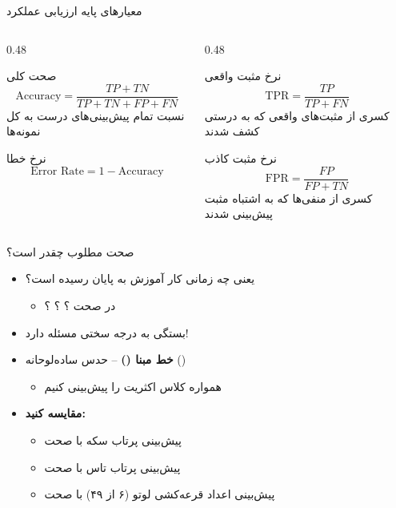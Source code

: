 \begin{frame}{معیارهای پایه ارزیابی عملکرد}{}
  \begin{columns}[T]
    \begin{column}{0.48\textwidth}
      \begin{block}{صحت کلی \ }
        \[
          \text{Accuracy} = \frac{TP + TN}{TP + TN + FP + FN}
        \]
        نسبت تمام پیش‌بینی‌های درست به کل نمونه‌ها
      \end{block}
      \begin{block}{نرخ خطا \ }
        \[
          \text{Error Rate} = 1 - \text{Accuracy}
        \]
      \end{block}
    \end{column}
    \begin{column}{0.48\textwidth}
      \begin{block}{نرخ مثبت واقعی \ }
        \[
          \text{TPR} = \frac{TP}{TP + FN}
        \]
        کسری از مثبت‌های واقعی که به درستی کشف شدند
      \end{block}
      \begin{block}{نرخ مثبت کاذب \ }
        \[
          \text{FPR} = \frac{FP}{FP + TN}
        \]
        کسری از منفی‌ها که به اشتباه مثبت پیش‌بینی شدند
      \end{block}
    \end{column}
  \end{columns}
\end{frame}

\begin{frame}{صحت مطلوب چقدر است؟}{}
  \begin{itemize}
    \setlength{\itemsep}{6pt}
    \item یعنی چه زمانی کار آموزش به پایان رسیده است؟
    \begin{itemize}
      \item در صحت ؟ ؟ ؟
    \end{itemize}
    \vspace{0.15cm}
    \item بستگی به درجه سختی مسئله دارد!
    \item \textbf{خط مبنا ()} -- حدس ساده‌لوحانه ()
    \begin{itemize}
      \item همواره کلاس اکثریت را پیش‌بینی کنیم
    \end{itemize}
    \vspace{0.15cm}
    \item \textbf{مقایسه کنید:}
    \begin{itemize}
      \item پیش‌بینی پرتاب سکه با صحت 
      \item پیش‌بینی پرتاب تاس با صحت 
      \item پیش‌بینی اعداد قرعه‌کشی لوتو (۶ از ۴۹) با صحت 
    \end{itemize}
  \end{itemize}
\end{frame}

